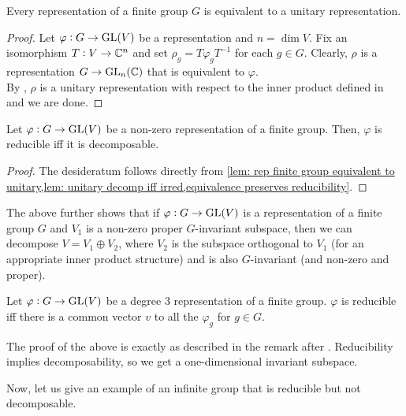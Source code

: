 			\begin{flem}
				\label{lem: rep finite group equivalent to unitary}
				Every representation of a finite group $G$ is equivalent to a unitary representation.
			\end{flem}
			\begin{proof}
				Let $\varphi : G \to \operatorname{GL}(V)$ be a representation and $n = \dim V$. Fix an isomorphism $T : V \to \mathbb{C}^n$ and set $\rho_g = T \varphi_g T^{-1}$ for each $g \in G$. Clearly, $\rho$ is a representation $G \to \operatorname{GL}_n(\mathbb{C})$ that is equivalent to $\varphi$.\\
				By , $\rho$ is a unitary representation with respect to the inner product defined in  and we are done.
			\end{proof}

			\begin{ftheo}
				\label{theo: finite group red iff decomp}
				Let $\varphi : G \to \operatorname{GL}(V)$ be a non-zero representation of a finite group. Then, $\varphi$ is reducible iff it is decomposable.
			\end{ftheo}
			\begin{proof}
				The desideratum follows directly from \cref{lem: rep finite group equivalent to unitary,lem: unitary decomp iff irred,equivalence preserves reducibility}.
			\end{proof}

			The above further shows that if $\varphi : G \to \operatorname{GL}(V)$ is a representation of a finite group $G$ and $V_1$ is a non-zero proper $G$-invariant subspace, then we can decompose $V = V_1 \oplus V_2$, where $V_2$ is the subspace orthogonal to $V_1$ (for an appropriate inner product structure) and is also $G$-invariant (and non-zero and proper).

			\begin{fprop}
				\label{prop: deg 3 reps of finite groups reducible iff common eigenvec}
				Let $\varphi : G \to \operatorname{GL}(V)$ be a degree $3$ representation of a finite group. $\varphi$ is reducible iff there is a common vector $v$ to all the $\varphi_g$ for $g \in G$.
			\end{fprop}
			The proof of the above is exactly as described in the remark after . Reducibility implies decomposability, so we get a one-dimensional invariant subspace.

			Now, let us give an example of an infinite group that is reducible but not decomposable.

